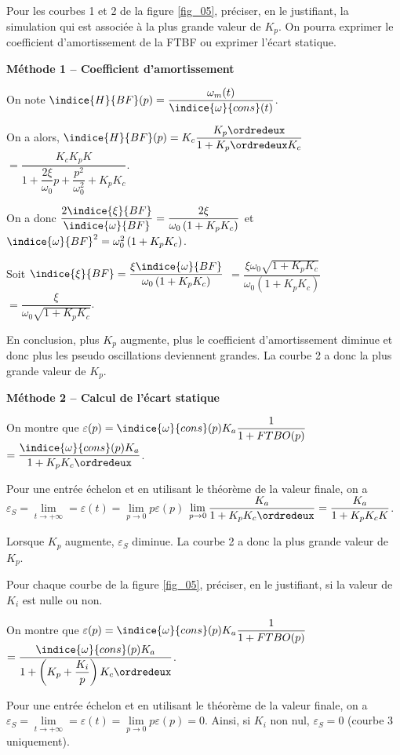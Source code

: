 \begin{question}
Pour les courbes 1 et 2 de la figure \ref{fig_05}, préciser, en le justifiant, la simulation qui est associée à la plus grande
valeur de $K_p$. On pourra exprimer le coefficient d'amortissement de la FTBF ou exprimer l'écart statique.
\end{question}
\ifprof
\begin{corrige}
\textbf{Méthode 1 -- Coefficient d'amortissement}

On note $\indice{H}{BF}(p) = \dfrac{\omega_m(t)}{\indice{\omega}{cons}(t)}$.


On a alors, $\indice{H}{BF}(p) = K_c \dfrac{K_p \ordredeux }{1+K_p \ordredeux  K_c}$
$=  \dfrac{K_cK_p K}{1+\dfrac{2\xi}{\omega_0}p+\dfrac{p^2}{\omega_0^2}+K_p K_c}$.

On a donc $\dfrac{2\indice{\xi}{BF}}{\indice{\omega}{BF}} = \dfrac{2\xi}{\omega_0\left(1+K_p K_c\right)}$
et $\indice{\omega}{BF}^2 = \omega_0^2 \left(1+K_p K_c\right)$.

Soit
$\indice{\xi}{BF} = \dfrac{\xi\indice{\omega}{BF}}{\omega_0\left(1+K_p K_c\right)}$ 
$= \dfrac{\xi\omega_0\sqrt{1+K_p K_c}}{\omega_0\left(1+K_p K_c\right)}$ 
$= \dfrac{\xi}{\omega_0\sqrt{1+K_p K_c}}$.

En conclusion, plus $K_p$ augmente, plus le coefficient d'amortissement diminue et donc plus les pseudo oscillations deviennent grandes. La courbe 2 a donc la plus grande valeur de $K_p$.

\textbf{Méthode 2 -- Calcul de l'écart statique}

On montre que $\varepsilon(p) = \indice{\omega}{cons}(p) K_a \dfrac{1}{1+FTBO(p)}$
$= \dfrac{\indice{\omega}{cons}(p) K_a}{1+K_p K_c\ordredeux }$.

Pour une entrée échelon et en utilisant le théorème de la valeur finale, on a 
$\varepsilon_S =  \lim\limits_{t\to +\infty} = \varepsilon(t) = \lim\limits_{p\to 0} p \varepsilon(p)$
$\lim\limits_{p\to 0} \dfrac{ K_a}{1+K_p K_c\ordredeux } = \dfrac{K_a}{1+K_p K_c K}$.

Lorsque $K_p$ augmente, $ \varepsilon_S$ diminue. La courbe 2 a donc la plus grande valeur de $K_p$.



\end{corrige}
\else
\fi

\begin{question}
Pour chaque courbe de la figure \ref{fig_05}, préciser, en le justifiant, si la valeur de $K_i$ est nulle ou non.
\end{question}
\ifprof
\begin{corrige}
On montre que $\varepsilon(p) = \indice{\omega}{cons}(p) K_a \dfrac{1}{1+FTBO(p)}$
$= \dfrac{\indice{\omega}{cons}(p) K_a}{1+\left( K_p + \dfrac{K_i}{p}\right) K_c\ordredeux }$.

Pour une entrée échelon et en utilisant le théorème de la valeur finale, on a 
$\varepsilon_S =  \lim\limits_{t\to +\infty} = \varepsilon(t) = \lim\limits_{p\to 0} p \varepsilon(p) = 0$.
Ainsi, si $K_i$ non nul, $\varepsilon_S  =0$ (courbe 3 uniquement).

\end{corrige}
\else
\fi





